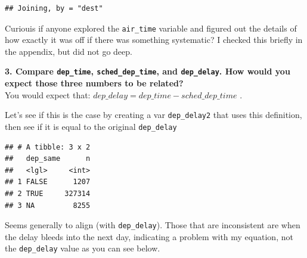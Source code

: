 \documentclass[]{book}
\newenvironment{Shaded}{\begin{snugshade}}{\end{snugshade}}
\newcommand{\CommentTok}[1]{\textcolor[rgb]{0.56,0.35,0.01}{\textit{#1}}}
\newcommand{\DataTypeTok}[1]{\textcolor[rgb]{0.13,0.29,0.53}{#1}}
\newcommand{\KeywordTok}[1]{\textcolor[rgb]{0.13,0.29,0.53}{\textbf{#1}}}
\newcommand{\NormalTok}[1]{#1}
\newcommand{\OperatorTok}[1]{\textcolor[rgb]{0.81,0.36,0.00}{\textbf{#1}}}
\newcommand{\StringTok}[1]{\textcolor[rgb]{0.31,0.60,0.02}{#1}}
\theoremstyle{definition}
\theoremstyle{definition}
\theoremstyle{definition}
\theoremstyle{remark}
\begin{document}
\begin{verbatim}
## Joining, by = "dest"
\end{verbatim}

Curiouis if anyone explored the \texttt{air\_time} variable and figured
out the details of how exactly it was off if there was something
systematic? I checked this briefly in the appendix, but did not go deep.

\textbf{3. Compare \texttt{dep\_time}, \texttt{sched\_dep\_time}, and
\texttt{dep\_delay}. How would you expect those three numbers to be
related?}\\
You would expect that: \(dep\_delay = dep\_time - sched\_dep\_time\) .

Let's see if this is the case by creating a var \texttt{dep\_delay2}
that uses this definition, then see if it is equal to the original
\texttt{dep\_delay}

\begin{Shaded}
\end{Shaded}

\begin{verbatim}
## # A tibble: 3 x 2
##   dep_same      n
##   <lgl>     <int>
## 1 FALSE      1207
## 2 TRUE     327314
## 3 NA         8255
\end{verbatim}

Seems generally to align (with \texttt{dep\_delay}). Those that are
inconsistent are when the delay bleeds into the next day, indicating a
problem with my equation, not the \texttt{dep\_delay} value as you can
see below.

\begin{Shaded}
\end{Shaded}
\end{document}
